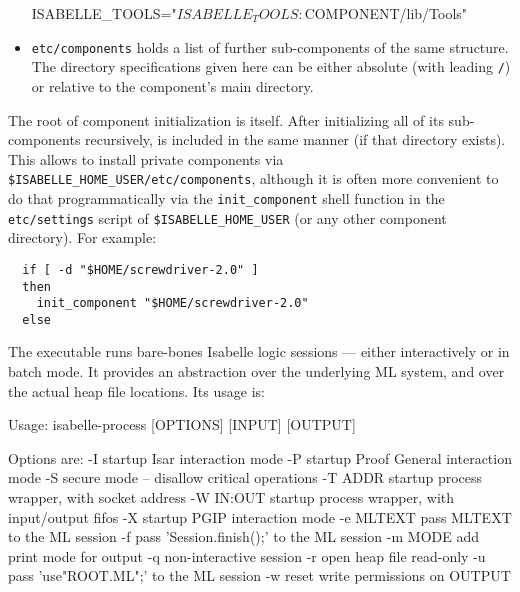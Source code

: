 \begin{isabellebody}
\begin{isamarkuptext}
\begin{itemize}
  \begin{ttbox}
  ISABELLE_TOOLS="$ISABELLE_TOOLS:$COMPONENT/lib/Tools"
  \end{ttbox}

  \item \verb|etc/components| holds a list of further
  sub-components of the same structure.  The directory specifications
  given here can be either absolute (with leading \verb|/|) or
  relative to the component's main directory.

  \end{itemize}

  The root of component initialization is \hyperlink{setting.ISABELLE-HOME}{\mbox{}}
  itself.  After initializing all of its sub-components recursively,
  \hyperlink{setting.ISABELLE-HOME-USER}{\mbox{}} is included in the same manner (if
  that directory exists).  This allows to install private components
  via \verb|$ISABELLE_HOME_USER/etc/components|, although it is
  often more convenient to do that programmatically via the
  \verb,init_component, shell function in the \verb,etc/settings,
  script of \verb,$ISABELLE_HOME_USER, (or any other component
  directory).  For example:
  \begin{verbatim}
  if [ -d "$HOME/screwdriver-2.0" ]
  then
    init_component "$HOME/screwdriver-2.0"
  else
  \end{verbatim}%
\end{isamarkuptext}%
\isamarkuptrue%
%
\isamarkuptrue%
%
\begin{isamarkuptext}%
The \hypertarget{executable.isabelle-process}{\hyperlink{executable.isabelle-process}{\mbox{}}} executable runs bare-bones
  Isabelle logic sessions --- either interactively or in batch mode.
  It provides an abstraction over the underlying ML system, and over
  the actual heap file locations.  Its usage is:

\begin{ttbox}
Usage: isabelle-process [OPTIONS] [INPUT] [OUTPUT]

  Options are:
    -I           startup Isar interaction mode
    -P           startup Proof General interaction mode
    -S           secure mode -- disallow critical operations
    -T ADDR      startup process wrapper, with socket address
    -W IN:OUT    startup process wrapper, with input/output fifos
    -X           startup PGIP interaction mode
    -e MLTEXT    pass MLTEXT to the ML session
    -f           pass 'Session.finish();' to the ML session
    -m MODE      add print mode for output
    -q           non-interactive session
    -r           open heap file read-only
    -u           pass 'use"ROOT.ML";' to the ML session
    -w           reset write permissions on OUTPUT


\end{ttbox}
\end{isamarkuptext}
\end{isabellebody}
